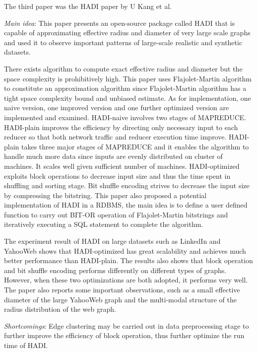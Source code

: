 The third paper was the HADI paper by U Kang et al.
\cite{DBLP:journals/tkdd/KangTAFL11}
\begin{itemize*}
\item {\em Main idea}: 
This paper presents an open-source package called HADI that is capable of approximating effective radius and diameter of very large scale graphs and used it to observe important patterns of large-scale realistic and synthetic datasets.

There exists algorithm to compute exact effective radius and diameter but the space complexity is prohibitively high. This paper uses Flajolet-Martin algorithm to constitute an approximation algorithm since Flajolet-Martin algorithm has a tight space complexity bound and unbiased estimate. As for implementation, one naive version, one improved version and one further optimized version are implemented and examined. HADI-naive involves two stages of MAPREDUCE. HADI-plain improves the efficiency by directing only necessary input to each reducer so that both network traffic and reducer execution time improve. HADI-plain takes three major stages of MAPREDUCE and it enables the algorithm to handle much more data since inputs are evenly distributed on cluster of machines. It scales well given sufficient number of machines. HADI-optimized exploits block operations to decrease input size and thus the time spent in shuffling and sorting stage. Bit shuffle encoding strives to decrease the input size by compressing the bitstring. This paper also proposed a potential implementation of HADI in a RDBMS, the main idea is to define a user defined function to carry out BIT-OR operation of Flajolet-Martin bitstrings and iteratively executing a SQL statement to complete the algorithm.

The experiment result of HADI on large datasets such as LinkedIn and YahooWeb shows that HADI-optimized has great scalability and achieves much better performance than HADI-plain. The results also shows that block operation and bit shuffle encoding performs differently on different types of graphs. However, when these two optimizations are both adopted, it performs very well. The paper also reports some important observations, such as a small effective diameter of the large YahooWeb graph and the multi-modal structure of the radius distribution of the web graph.

\item {\em Shortcomings}:
Edge clustering may be carried out in data preprocessing stage to further improve the efficiency of block operation, thus further optimize the run time of HADI.
\end{itemize*}

